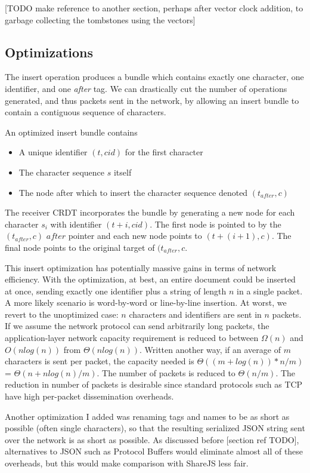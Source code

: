 \documentclass[12pt,a4paper,twoside,openright]{report}
\begin{document}
			[TODO make reference to another section, perhaps after vector clock addition, to garbage collecting the tombstones using the vectors]
		
		\subsection{Optimizations}
			The insert operation produces a bundle which contains exactly one character, one identifier, and one \textit{after} tag. We can drastically cut the number of operations generated, and thus packets sent in the network, by allowing an insert bundle to contain a contiguous sequence of characters. 
			
			An optimized insert bundle contains
			\begin{itemize}
				\item A unique identifier  $(t, cid)$ for the first character
				\item The character sequence $s$ itself
				\item The node after which to insert the character sequence denoted $(t_{after}, c)$
			\end{itemize}
			The receiver CRDT incorporates the bundle by generating a new node for each character $s_i$ with identifier $(t + i, cid)$. The first node is pointed to by the $(t_{after}, c)$ $after$ pointer and each new node points to $(t + (i+1), c)$. The final node points to the original target of $(t_{after}, c$.
			
			This insert optimization has potentially massive gains in terms of network efficiency. With the optimization, at best, an entire document could be inserted at once, sending exactly one identifier plus a string of length $n$ in a single packet. A more likely scenario is word-by-word or line-by-line insertion. At worst, we revert to the unoptimized case: $n$ characters and identifiers are sent in $n$ packets. If we assume the network protocol can send arbitrarily long packets, the application-layer network capacity requirement is reduced to between $\Omega (n)$ and $O(nlog(n))$ from $\Theta(nlog(n))$. Written another way, if an average of $m$ characters is sent per packet, the capacity needed is $\Theta ((m+log(n)) * n/m)$ = $\Theta (n + nlog(n)/m)$. The number of packets is reduced to $\Theta (n/m)$. The reduction in number of packets is desirable since standard protocols such as TCP have high per-packet dissemination overheads.
			
			Another optimization I added was renaming tags and names to be as short as possible (often single characters), so that the resulting serialized JSON string sent over the network is as short as possible. As discussed before [section ref TODO], alternatives to JSON such as Protocol Buffers would eliminate almost all of these overheads, but this would make comparison with ShareJS less fair.
	
\end{document}
